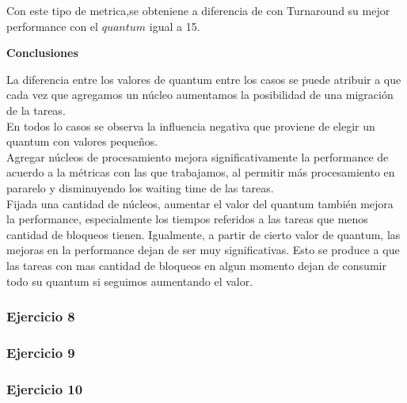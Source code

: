    \indent Con este tipo de metrica,se obteniene a diferencia de con Turnaround  su mejor
   performance con el $quantum$ igual a 15.\\
  
 \begin{center}
  \textbf{Conclusiones}
 \end{center}


\indent \indent La diferencia entre los valores de quantum entre los casos se puede atribuir a que cada vez que 
agregamos un núcleo aumentamos la posibilidad de una migración de la tareas.\\
\indent \indent En todos lo casos se observa la influencia negativa que proviene de elegir un quantum con valores pequeños.\\
\indent \indent Agregar núcleos de procesamiento mejora significativamente la performance de acuerdo a la métricas con las que
trabajamos, al permitir más procesamiento en pararelo y disminuyendo los waiting time de las tareas.\\
\indent \indent  Fijada una cantidad de núcleos, aumentar el valor del quantum también mejora la performance, 
especialmente los tiempos referidos a las tareas que menos cantidad de bloqueos tienen. 
Igualmente, a partir de cierto valor de quantum, las mejoras en la performance dejan de ser muy significativas. 
Esto se produce a que las tareas con mas cantidad de bloqueos en algun momento dejan de consumir todo
su quantum si seguimos aumentando el valor. 
 
 
 
\subsubsection[Resolución Ejercicio 8]{Ejercicio 8}

  
\subsubsection[Resolución Ejercicio 9]{Ejercicio 9}

\subsubsection[Resolución Ejercicio 10]{Ejercicio 10}
